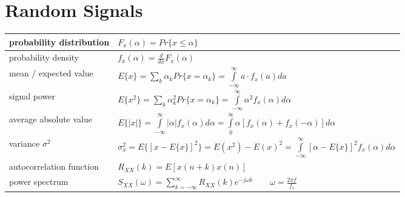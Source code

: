 \section{Random Signals}
\begin{tabularx}{\linewidth}{|l|X|}
	\hline
	probability distribution & $F_x(\alpha) = Pr\{x \leq \alpha \}$ \\
	\hline
	probability density & $f_x(\alpha) = \frac{d}{dx}F_x(\alpha)$\\
	\hline
	mean / expected value & $E\{x\} = \sum\limits_k \alpha_k Pr\{x = \alpha_k\} =
	\int\limits_{-\infty}^{\infty}a\cdot f_x(a)da$
	\\
	\hline
	signal power & $E\{ x^2 \} = \sum\limits_k \alpha_k^2 Pr\{x = \alpha_k\} =
	\int\limits_{-\infty}^{\infty} \alpha^2 f_x(\alpha) d\alpha$ \\
	\hline
	average absolute value & $E\{ |x| \} = \int\limits_{-\infty}^{\infty} |\alpha| f_x(\alpha) d\alpha 
										 = \int\limits_{0}^{\infty} \alpha[f_x(\alpha) + f_x(-\alpha)] d\alpha $
	\\ \hline
	variance $\sigma^2$ & 
	$\sigma_x^2 = E\{ [x-E\{ x \}]^2 \} = E(x^2) - E(x)^2 = \int\limits_{-\infty}^{\infty}[\alpha - E\{ x \}]^2 f_x(\alpha) d\alpha $
	\\ \hline
	autocorrelation function & 
	$R_{XX}(k) = E[x(n+k)x(n)]$
	\\ \hline
	power spectrum & 
	$S_{XX}(\omega) = \sum\limits_{k=-\infty}^{\infty} R_{XX}(k)e^{-j\omega k} \qquad \omega = \frac{2\pi f}{f_s} $
	\\ \hline
\end{tabularx}